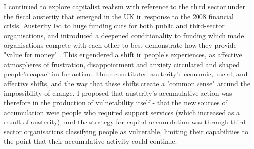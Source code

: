 I continued to explore capitalist realism with reference to the third sector under the fiscal austerity that emerged in the UK in response to the 2008 financial crisis. Austerity led to huge funding cuts for both public and third-sector organisations, and introduced a deepened conditionality to funding  which made organisations compete with each other to best demonstrate how they provide "value for money" \citep{clifford_charitable_2017, jones_uneven_2016, clayton_distancing_2016}. This engendered a shift in people's experiences, as affective atmospheres of frustration, disappointment and anxiety circulated \citep{hitchen_living_2016} and shaped people's capacities for action. These constituted austerity's economic, social, and affective shifts, and the way that these shifts create a "common sense" around the impossibility of change. I proposed that austerity's accumulative action was therefore in the production of vulnerability itself - that the new sources of accumulation were people who required support services  (which increased as a result of austerity), and the strategy for capital accumulation was through third sector organisations classifying people as vulnerable, limiting their capabilities to the point that their accumulative activity could continue. 

